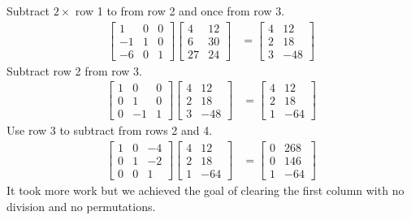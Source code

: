 \documentclass[12pt,twoside,dvipsnames,letterpaper]{memoir}
\begin{document}
Subtract $2\times$ row 1 to from row 2 and once from row 3.
\begin{align*}
    \begin{bmatrix}
        1 & 0 & 0 \\
        -1 & 1 & 0 \\
        -6 & 0 & 1
    \end{bmatrix}
    \begin{bmatrix}
        4 & 12\\
        6 & 30 \\
        27 & 24
     \end{bmatrix}
     & = 
     \begin{bmatrix}
        4 & 12 \\
        2 & 18 \\
        3 & -48 
     \end{bmatrix}
\end{align*}
Subtract row 2 from row 3.
\begin{align*}
     \begin{bmatrix}
        1 & 0 & 0 \\
        0 & 1 & 0 \\
        0 & -1 & 1
    \end{bmatrix}
     \begin{bmatrix}
        4 & 12 \\
        2 & 18 \\
        3 & -48 
     \end{bmatrix}
     & = 
     \begin{bmatrix}
        4 & 12 \\
        2 & 18 \\
        1 & -64 
     \end{bmatrix}
\end{align*}
Use row 3 to subtract from rows 2 and 4.
\begin{align*}
     \begin{bmatrix}
        1 & 0 & -4 \\
        0 & 1 & -2 \\
        0 & 0 & 1
    \end{bmatrix}
     \begin{bmatrix}
        4 & 12 \\
        2 & 18 \\
        1 & -64 
     \end{bmatrix}
     & = 
     \begin{bmatrix}
        0 & 268\\
        0 & 146\\
        1 & -64 
     \end{bmatrix}
\end{align*}
It took more work but we achieved the goal of clearing 
the first column with no division and no permutations.
\end{document}
